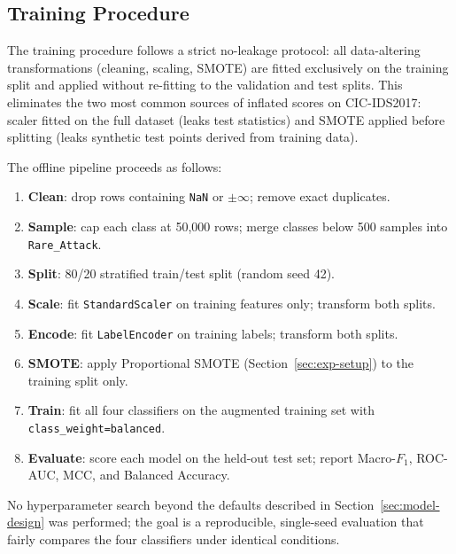 \subsection{Training Procedure}
\label{sec:training}

The training procedure follows a strict no-leakage protocol: all data-altering transformations (cleaning, scaling, SMOTE) are fitted exclusively on the training split and applied without re-fitting to the validation and test splits. This eliminates the two most common sources of inflated scores on CIC-IDS2017: scaler fitted on the full dataset (leaks test statistics) and SMOTE applied before splitting (leaks synthetic test points derived from training data).

The offline pipeline proceeds as follows:
\begin{enumerate}
    \item \textbf{Clean}: drop rows containing \texttt{NaN} or $\pm\infty$; remove exact duplicates.
    \item \textbf{Sample}: cap each class at 50,000 rows; merge classes below 500 samples into \texttt{Rare\_Attack}.
    \item \textbf{Split}: 80/20 stratified train/test split (random seed 42).
    \item \textbf{Scale}: fit \texttt{StandardScaler} on training features only; transform both splits.
    \item \textbf{Encode}: fit \texttt{LabelEncoder} on training labels; transform both splits.
    \item \textbf{SMOTE}: apply Proportional SMOTE (Section~\ref{sec:exp-setup}) to the training split only.
    \item \textbf{Train}: fit all four classifiers on the augmented training set with \texttt{class\_weight=balanced}.
    \item \textbf{Evaluate}: score each model on the held-out test set; report Macro-$F_1$, ROC-AUC, MCC, and Balanced Accuracy.
\end{enumerate}

No hyperparameter search beyond the defaults described in Section~\ref{sec:model-design} was performed; the goal is a reproducible, single-seed evaluation that fairly compares the four classifiers under identical conditions.
